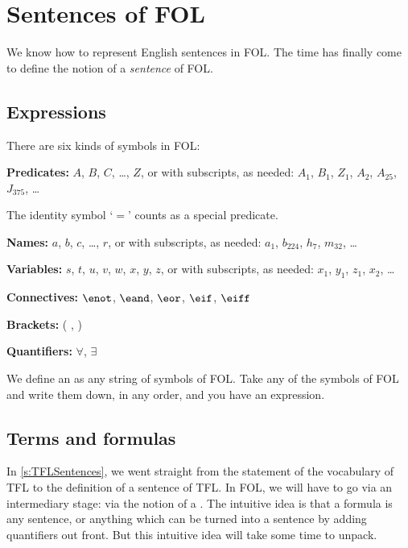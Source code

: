 \chapter{Sentences of FOL}\label{s:FOLSentences}
We know how to represent English sentences in FOL. The time has finally come to define the notion of a \emph{sentence} of FOL.

\section{Expressions}
There are six kinds of symbols in FOL:

\begin{compactlist}
\item \textbf{Predicates:} $A$, $B$, $C$, \dots, $Z$, or 
with subscripts, as needed: $A_1$, $B_1$, $Z_1$, $A_2$, $A_{25}$,
$J_{375}$, \dots

The identity symbol `$=$' counts as a special predicate.
\item \textbf{Names:} $a$, $b$, $c$, \dots, $r$, or
with subscripts, as needed: $a_1$, $b_{224}$, $h_7$, $m_{32}$, \dots
\item \textbf{Variables:} $s$, $t$, $u$, $v$, $w$, $x$, $y$, $z$, or
with subscripts, as needed: $x_1$, $y_1$, $z_1$, $x_2$, \dots
\item \textbf{Connectives:}  $\enot$, $\eand$, $\eor$, $\eif$, $\eiff$
\item \textbf{Brackets:} ( , )
\item \textbf{Quantifiers:}  $\forall$, $\exists$
\end{compactlist}
We define an  as any string of symbols of FOL. Take any of the symbols of FOL and write them down, in any order, and you have an expression.

\section{Terms and formulas}
\label{s:TermsFormulas}

In \cref{s:TFLSentences}, we went straight from the statement of the vocabulary of TFL to the definition of a sentence of TFL. In FOL, we will have to go via an intermediary stage: via the notion of a . The intuitive idea is that a formula is any sentence, or anything which can be turned into a sentence by adding quantifiers out front. But this intuitive idea will take some time to unpack.

